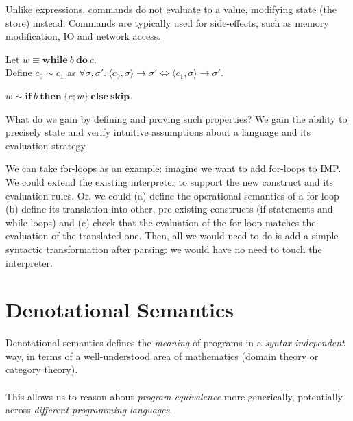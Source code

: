 Unlike expressions, commands do not evaluate to a value, modifying state (the
store) instead. Commands are typically used for side-effects, such as memory
modification, IO and network access.

\begin{frame}
    Let $w \equiv \mathbf{while}\ b\ \mathbf{do}\ c$.\\
    Define $c_0 \sim c_1$ as $\forall \sigma, \sigma'.\ \langle c_0, \sigma
    \rangle \rightarrow \sigma' \Leftrightarrow \langle c_1, \sigma \rangle
    \rightarrow \sigma'$.
    \begin{theorem}
        $w \sim \mathbf{if}\ b\ \mathbf{then}\ \{c; w\}\ \mathbf{else}\ \mathbf{skip}$.
    \end{theorem}
\end{frame}

What do we gain by defining and proving such properties? We gain the ability
to precisely state and verify intuitive assumptions about a language and its
evaluation strategy.

We can take for-loops as an example: imagine we want to add for-loops to
IMP. We could extend the existing interpreter to support the new construct
and its evaluation rules. Or, we could (a) define the operational semantics
of a for-loop (b) define its translation into other, pre-existing constructs
(if-statements and while-loops) and (c) check that the evaluation of the
for-loop matches the evaluation of the translated one. Then, all we would
need to do is add a simple syntactic transformation after parsing: we would
have no need to touch the interpreter.

\section{Denotational Semantics}

\begin{frame}
    Denotational semantics defines the \emph{meaning} of programs in a
    \emph{syntax-independent} way, in terms of a well-understood area of
    mathematics (domain theory or category theory).\\~\\
    This allows us to reason about \emph{program equivalence} more
    generically, potentially across \emph{different programming languages}.
\end{frame}

